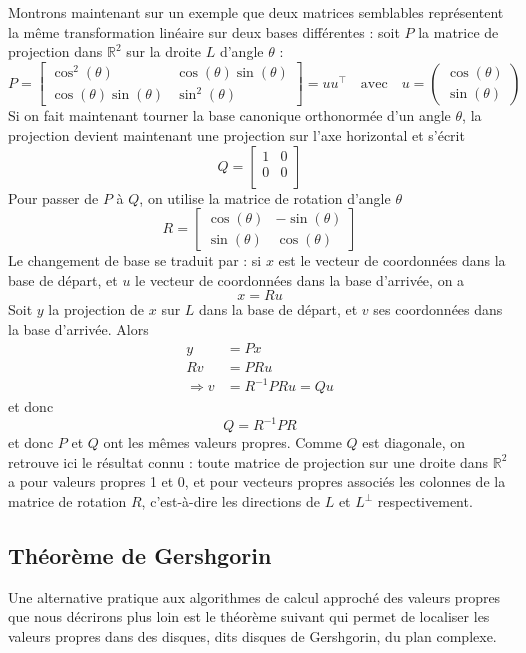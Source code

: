 Montrons maintenant sur un exemple que deux matrices semblables représentent la même transformation linéaire sur deux bases différentes : soit $P$ la matrice de projection dans $\mathbb{R}^2$ sur la droite $L$ d'angle $\theta$ : 
$$P =
\left[
\begin{array}{cc}
\cos^2(\theta) & \cos(\theta)\sin(\theta)\\
\cos(\theta)\sin(\theta)& \sin^2(\theta)
\end{array}
\right]
=uu^\top \quad\mbox{avec}\quad u=\begin{pmatrix}\cos(\theta)\\ \sin(\theta)\end{pmatrix}
$$ 
Si on fait maintenant tourner la base canonique orthonormée d'un angle $\theta$, la projection devient maintenant une projection sur l'axe horizontal et s'écrit
$$Q =
\left[
\begin{array}{cc}
1&0\\
0&0\\
\end{array}
\right]
$$ 
Pour passer de $P$ à $Q$, on utilise la matrice de rotation d'angle $\theta$ 
$$R =
\left[
\begin{array}{cc}
\cos(\theta) & -\sin(\theta)\\
\sin(\theta)& \cos(\theta)
\end{array}
\right]
$$ 
Le changement de base se traduit par : si $x$ est le vecteur de coordonnées dans la base de départ, et $u$ le vecteur de coordonnées dans la base d'arrivée, on a 
$$x=Ru$$
Soit $y$ la projection de $x$ sur $L$ dans la base de départ, et $v$ ses coordonnées dans la base d'arrivée. Alors 
\begin{align*}
y &= Px\\
Rv&= PRu\\ \Rightarrow v&=R^{-1}PRu=Qu
\end{align*}
et donc 
$$Q=R^{-1}PR$$
et donc $P$ et $Q$ ont les mêmes valeurs propres. Comme $Q$ est diagonale, on retrouve ici le résultat connu : toute matrice de projection sur une droite dans $\mathbb{R}^2$ a pour valeurs propres 1 et 0, et pour vecteurs propres associés les colonnes de la matrice de rotation $R$, c'est-à-dire les directions de $L$ et $L^{\bot}$ respectivement.

\subsection{Théorème de Gershgorin} %
Une alternative pratique aux algorithmes de calcul approché des valeurs propres que nous décrirons plus loin est le théorème suivant qui permet de localiser les valeurs propres dans des disques, dits disques de Gershgorin, du plan complexe.

